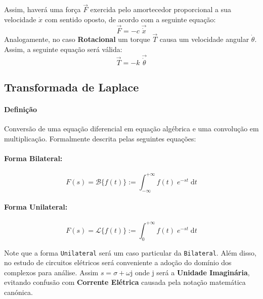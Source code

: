 \documentclass{article}
\begin{document}
\begin{multicols}{2}
                        Assim, haverá uma força $\vec{F}$ exercida pelo amortecedor  proporcional a sua velocidade $\dot{x}$ com sentido oposto, de acordo com a seguinte equação:
                            \begin{equation}
                                \boxed{
                                    \vec{F} = - c\;\vec{\dot{x}}
                                }
                            \end{equation}
                        Analogamente, no caso \textbf{Rotacional} um torque $\vec{T}$ causa um velocidade angular $\dot{\theta}$. Assim, a seguinte equação será válida:
                            \begin{equation}
                                \boxed{
                                    \vec{T} = - k\;\vec{\dot{\theta}}
                                }
                            \end{equation}
                \end{multicols}\noindent
\newpage

\subsection{Transformada de Laplace}
    \paragraph{Definição}Conversão de uma equação diferencial em equação algébrica e uma convolução em multiplicação. Formalmente descrita pelas seguintes equações:
    \begin{multicols}{2}
        \raggedcolumns
        \paragraph{Forma Bilateral:}
        \begin{equation}
            \boxed{
                F(s) = \mathcal{B} \{ f(t) \} := \int_{-\infty}^{+\infty} f(t) \; e^{-st} \; \text{d}t
            }
        \end{equation}
        \columnbreak
        \paragraph{Forma Unilateral:}
        \begin{equation}
            \boxed{
                F(s) = \mathcal{L}\{ f(t) \} := \int_{0}^{+\infty} f(t) \; e^{-st} \; \text{d} t
            }
        \end{equation}
    \end{multicols}\noindent
    Note que a forma \texttt{Unilateral} será um caso particular da \texttt{Bilateral}. Além disso, no estudo de circuitos elétricos será conveniente a adoção do domínio dos complexos para análise. Assim $s = \sigma + \omega\text{j}$ onde $\text{j}$ será a \textbf{Unidade Imaginária}, evitando confusão com \textbf{Corrente Elétrica} causada pela notação matemática canónica.
\end{document}
